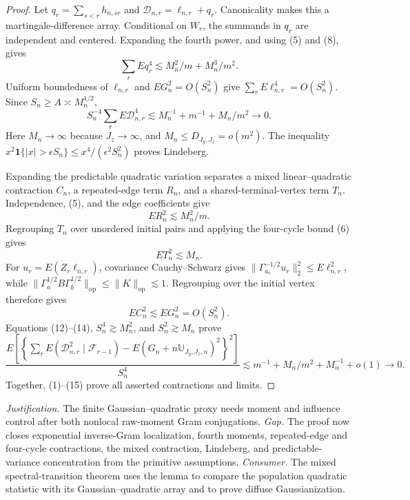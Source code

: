 \documentclass{article}
\begin{document}
\begin{proof}
Let \(q_r=\sum_{s<r}h_{n,sr}\) and \(\mathcal D_{n,r}=\ell_{n,r}+q_r\).  Canonicality makes this a martingale-difference array.  Conditional on \(W_r\), the summands in \(q_r\) are independent and centered.  Expanding the fourth power, and using (5) and (8), gives
\[
\sum_rEq_r^4\lesssim M_n^2/m+M_n^3/m^2. \tag{10}
\]
Uniform boundedness of \(\ell_{n,r}\) and \(EG_n^2=O(S_n^2)\) give \(\sum_rE\ell_{n,r}^4=O(S_n^2)\).  Since \(S_n\ge A\asymp M_n^{1/2}\),
\[
S_n^{-4}\sum_rE\mathcal D_{n,r}^4
\lesssim M_n^{-1}+m^{-1}+M_n/m^2\to0. \tag{11}
\]
Here \(M_n\to\infty\) because \(J_z\to\infty\), and \(M_n\le D_{J_y,J_z}=o(m^2)\).  The inequality \(x^2\mathbf1\{|x|>\epsilon S_n\}\le x^4/(\epsilon^2S_n^2)\) proves Lindeberg.

Expanding the predictable quadratic variation separates a mixed linear--quadratic contraction \(C_n\), a repeated-edge term \(R_n\), and a shared-terminal-vertex term \(T_n\).  Independence, (5), and the edge coefficients give
\[
ER_n^2\lesssim M_n^2/m. \tag{12}
\]
Regrouping \(T_n\) over unordered initial pairs and applying the four-cycle bound (6) gives
\[
ET_n^2\lesssim M_n. \tag{13}
\]
For \(u_r=E(Z_r\ell_{n,r})\), covariance Cauchy--Schwarz gives \(\|\Gamma_{a_r}^{-1/2}u_r\|_2^2\le E\ell_{n,r}^2\), while \(\|\Gamma_a^{1/2}B\Gamma_b^{1/2}\|_{\mathrm{op}}\le\|K\|_{\mathrm{op}}\lesssim1\).  Regrouping over the initial vertex therefore gives
\[
EC_n^2\lesssim EG_n^2=O(S_n^2). \tag{14}
\]
Equations (12)--(14), \(S_n^4\gtrsim M_n^2\), and \(S_n^2\gtrsim M_n\) prove
\[
\frac{E\left[\left\{\sum_rE(\mathcal D_{n,r}^2\mid\mathcal F_{r-1})
-E(G_n+n\mathbb U_{J_y,J_z,n})^2\right\}^2\right]}{S_n^4}
\lesssim m^{-1}+M_n/m^2+M_n^{-1}+o(1)\to0. \tag{15}
\]
Together, (1)--(15) prove all asserted contractions and limits.
\end{proof}
\par\smallskip\noindent \textit{Justification.} The finite Gaussian--quadratic proxy needs moment and influence control after both nonlocal raw-moment Gram conjugations. \textit{Gap.} The proof now closes exponential inverse-Gram localization, fourth moments, repeated-edge and four-cycle contractions, the mixed contraction, Lindeberg, and predictable-variance concentration from the primitive assumptions. \textit{Consumer.} The mixed spectral-transition theorem uses the lemma to compare the population quadratic statistic with its Gaussian--quadratic array and to prove diffuse Gaussianization.
\end{document}
